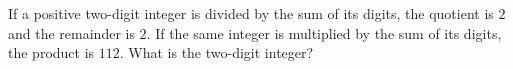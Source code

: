 If a positive two-digit integer is divided by the sum of its digits, the quotient is $2$ and the remainder is $2$. If the same integer is multiplied by the sum of its digits, the product is $112$. What is the two-digit integer?
